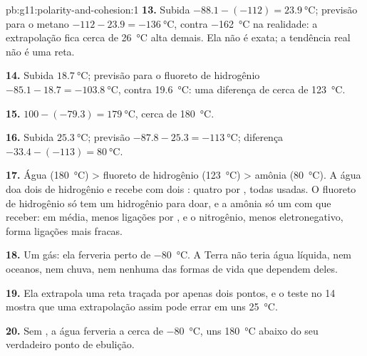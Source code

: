 \begin{solution}{pb:g11:polarity-and-cohesion:1}
\textbf{13.} Subida $-88.1 - (-112) = \qty{23.9}{\celsius}$; previsão
para o metano $-112 - 23.9 = \qty{-136}{\celsius}$, contra
\qty{-162}{\celsius} na realidade: a extrapolação fica cerca de
\qty{26}{\celsius} alta demais. Ela não é exata; a tendência real não é
uma reta.

\textbf{14.} Subida $\qty{18.7}{\celsius}$; previsão para o fluoreto de
hidrogênio $-85.1 - 18.7 = \qty{-103.8}{\celsius}$, contra
\qty{19.6}{\celsius}: uma diferença de cerca de \qty{123}{\celsius}.

\textbf{15.} $100 - (-79.3) = \qty{179}{\celsius}$, cerca de
\qty{180}{\celsius}.

\textbf{16.} Subida $\qty{25.3}{\celsius}$; previsão $-87.8 - 25.3 =
\qty{-113}{\celsius}$; diferença $-33.4 - (-113) = \qty{80}{\celsius}$.

\textbf{17.} Água (\qty{180}{\celsius}) > fluoreto de hidrogênio
(\qty{123}{\celsius}) > amônia (\qty{80}{\celsius}). A água doa dois
 de hidrogênio e recebe com dois : quatro
 por , todas usadas. O fluoreto de
hidrogênio só tem um hidrogênio para doar, e a amônia só um  com que receber: em média, menos ligações por , e o
nitrogênio, menos eletronegativo, forma ligações mais fracas.

\textbf{18.} Um gás: ela ferveria perto de \qty{-80}{\celsius}. A Terra
não teria água líquida, nem oceanos, nem chuva, nem nenhuma das formas
de vida que dependem deles.

\textbf{19.} Ela extrapola uma reta traçada por apenas dois pontos, e o
teste no  14 mostra que uma extrapolação assim pode errar em uns
\qty{25}{\celsius}.

\textbf{20.} Sem , a água ferveria a cerca de
\qty{-80}{\celsius}, uns \qty{180}{\celsius} abaixo do seu verdadeiro
ponto de ebulição.
\end{solution}
